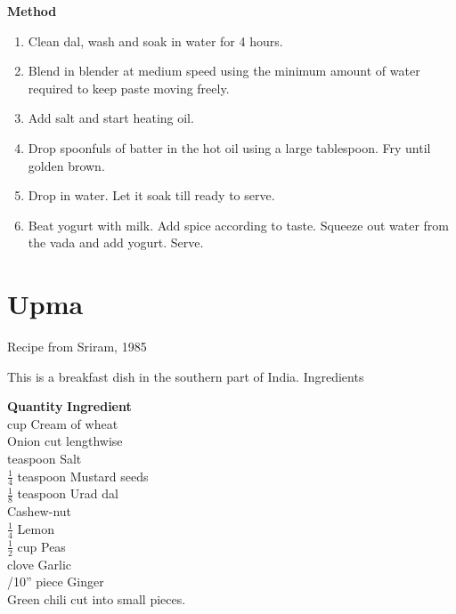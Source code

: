 {\bf Method}
\begin{enumerate}
\item  Clean dal, wash and soak in water for 4 hours.
\item Blend in blender at medium speed using the minimum amount
 of water required to keep paste moving freely.
\item Add salt and start heating oil.
\item Drop spoonfuls of batter in the hot oil using a large tablespoon. Fry until golden
brown.
\item Drop in water. Let it soak till ready to serve.
\item Beat yogurt with milk. Add spice according to taste. Squeeze out water from
the vada and add yogurt. Serve.
\end{enumerate}


\section{Upma}
  Recipe from Sriram, 1985

  This is a breakfast dish in the southern part of India.  Ingredients

\begin{tabbing}
\hspace{1.0cm}  \={\bf Quantity}   \hspace{3.0cm} \={\bf Ingredient}\\
 cup   \>Cream of wheat \\
   \>Onion  cut lengthwise\\
 teaspoon   \>Salt \\
\>$\frac{1}{4}$ teaspoon   \>Mustard seeds \\
 \>$\frac{1}{8}$ teaspoon   \>Urad dal\\
   \>Cashew-nut \\
\>$\frac{1}{4}$   \>Lemon \\
\>$\frac{1}{2}$ cup   \>Peas \\
 clove   \>Garlic \\
/10'' piece \>Ginger\\
 \> Green chili cut into small pieces.\\
\end{tabbing}

